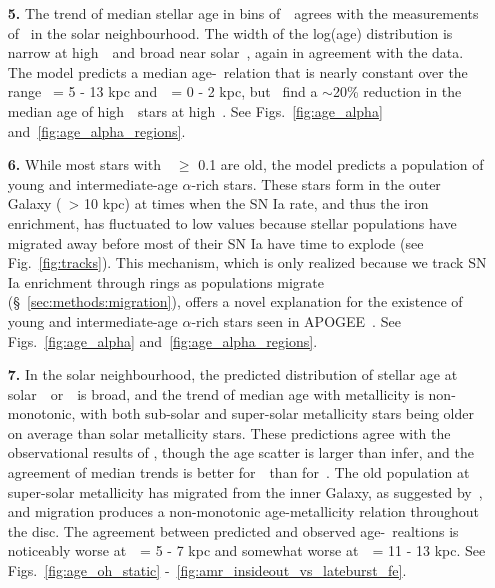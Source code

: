 \documentclass[draft2.tex]{subfiles}
\begin{document}
\begin{enumerate}
	\item[\textbf{5.}] The trend of median stellar age in bins of~\ofe~agrees 
	with the measurements of~\citet{Feuillet2019} in the solar neighbourhood. 
	The width of the log(age) distribution is narrow at high~\ofe~and broad 
	near solar~\ofe, again in agreement with the data. The model predicts a 
	median age-\ofe~relation that is nearly constant over the range 
	\rgal~= 5 - 13 kpc and~\absz~= 0 - 2 kpc, but~\citet{Feuillet2019} find a 
	$\sim$20\% reduction in the median age of high~\ofe~stars at high~\absz. 
	See Figs.~\ref{fig:age_alpha} and~\ref{fig:age_alpha_regions}. 

	\item[\textbf{6.}] While most stars with~\ofe~$\geq$ 0.1 are old, the model 
	predicts a population of young and intermediate-age $\alpha$-rich stars. 
	These stars form in the outer Galaxy (\rgal~> 10 kpc) at times when the SN 
	Ia rate, and thus the iron enrichment, has fluctuated to low values because 
	stellar populations have migrated away before most of their SN Ia have time 
	to explode (see Fig.~\ref{fig:tracks}). 
	This mechanism, which is only realized because we track SN Ia enrichment 
	through rings as populations migrate (\S~\ref{sec:methods:migration}), 
	offers a novel explanation for the existence of young and intermediate-age 
	$\alpha$-rich stars seen in APOGEE~\citep{Chiappini2015, Martig2015, 
	Martig2016, Jofre2016, Yong2016, Izzard2018, SilvaAguirre2018, 
	Warfield2021}. 
	See Figs.~\ref{fig:age_alpha} and~\ref{fig:age_alpha_regions}. 

	\item[\textbf{7.}] In the solar neighbourhood, the predicted distribution 
	of stellar age at solar~\feh~or~\oh~is broad, and the trend of median age 
	with metallicity is non-monotonic, with both sub-solar and super-solar 
	metallicity stars being older on average than solar metallicity stars. 
	These predictions agree with the observational results of 
	\citet{Feuillet2019}, though the age scatter is larger than 
	\citet{Feuillet2019} infer, and the agreement of median trends is better 
	for~\oh~than for~\feh. 
	The old population at super-solar metallicity has migrated from the inner 
	Galaxy, as suggested by~\citet{Feuillet2018, Feuillet2019}, and migration 
	produces a non-monotonic age-metallicity relation throughout the disc. 
	The agreement between predicted and observed age-\feh~realtions is 
	noticeably worse at~\rgal~= 5 - 7 kpc and somewhat worse at~\rgal~= 11 - 13 
	kpc. 
	See Figs.~\ref{fig:age_oh_static} -~\ref{fig:amr_insideout_vs_lateburst_fe}. 


\end{enumerate}
\end{document}
